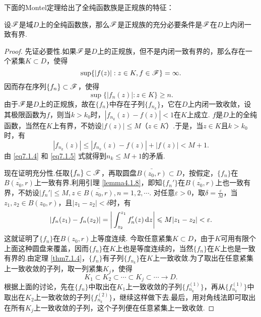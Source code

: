 下面的Montel定理给出了全纯函数族是正规族的特征：
\begin{theorem}\label{thm7.1.5}
设$\mathscr F$是域$D$上的全纯函数族，那么$\mathscr F$是正规族的充分必要条件是$\mathscr F$在$D$上内闭一致有界.
\end{theorem}
\begin{proof}
先证必要性.如果$\mathscr F$是$D$上的正规族，但不是内闭一致有界的，那么存在一个紧集$K\subset D$，使得
\[\sup\{|f(z)|:z\in K,f\in\mathscr F\}=\infty.\]
因而存在序列$\{f_n\}\subset \mathscr F$，使得
\begin{equation}\label{eq7.1.4}
\sup\{|f_n(z)|:z\in K\}\ge n.
\end{equation}
由于$\mathscr F$是$D$上的正规族，故在$\{f_n\}$中存在子列$\{f_{n_k}\}$，它在$D$上内闭一致收敛，设其极限函数为$f$，则当$k>k_0$时，$|f_{n_k}(z)-f(z)|<1$在$K$上成立. $f$是$D$上的全纯函数，当然在$K$上有界，不妨设$|f(z)|\le M$（$z\in K$）.于是，当$z\in K$且$k>k_0$时，有
\begin{equation}\label{eq7.1.5}
|f_{n_k}(z)|\le |f_{n_k}(z)-f(z)|+|f(z)|<M+1.
\end{equation}
由 \eqref{eq7.1.4} 和 \eqref{eq7.1.5} 式就得到$n_k\le M+1$的矛盾.

现在证明充分性.任取$\{f_n\}\subset\mathscr F$，再取圆盘$\bar{B(z_0,r)}\subset D$，按假定，$\{f_n\}$在$\bar{B(z_0,r)}$上一致有界.利用引理 \ref{lemma4.1.8}，即知$\{f_n'\}$在$\bar{B(z_0,r)}$上也一致有界，不妨设$|f_n'|\le M,z\in\bar{B(z_0,r)},n=1,2,\cdots$. 对任意$\varepsilon>0$，取$\delta=\frac\varepsilon M$，当$z_1,z_2\in B(z_0,r)$，且$|z_1-z_2|<\delta$时，有
\[|f_n(z_1)-f_n(z_2)|=\bigg|\int_{z_2}^{z_1}f_n'(z)\mathop{}\!\mathrm dz\bigg|\leqslant M|z_1-z_2|<\varepsilon.\]
这就证明了$\{f_n\}$在$B(z_0,r)$上等度连续. 今取任意紧集$K\subset D$，由于$K$可用有限个上面这种圆盘来覆盖，因而$\{f_n\}$在$K$上也是等度连续的，当然$\{f_n\}$在$K$上也是一致有界的.由定理 \ref{thm7.1.4}，$\{f_n\}$有子列$\{f_{n_k}\}$在$K$上一致收敛.为了取出在任意紧集上一致收敛的子列，取一列紧集$K_j$，使得
\[K_1\subset K_2\subset\cdots\subset K_j\subset\cdots\to D.\]
根据上面的讨论，先在$\{f_n\}$中取出在$K_1$上一致收敛的子列$\{f_{n_k}^{(1)}\}$，再从$\{f_{n_k}^{(1)}\}$中取出在$K_2$上一致收敛的子列$\{f_{n_k}^{(2)}\}$，继续这样做下去.最后，用对角线法即可取出在所有$K_j$上一致收敛的子列，这个子列便在任意紧集上一致收敛.
\end{proof}

